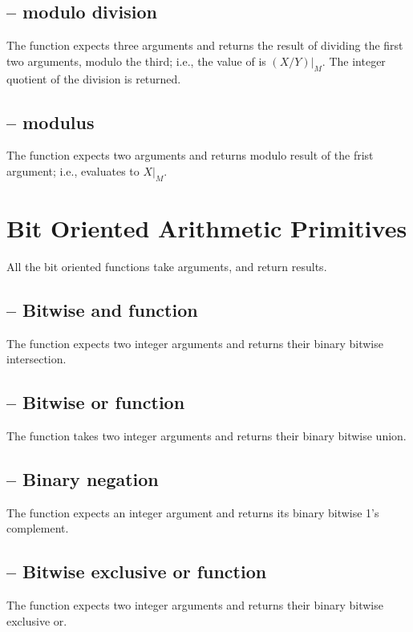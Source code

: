 \subsection{ -- modulo division}
The  function expects three  arguments and returns the result of dividing the first two arguments, modulo the third; i.e., the value of  is $(X/Y)|_M$.
The integer quotient of the division is returned.

\subsection{ -- modulus }
The  function expects two  arguments and returns modulo result of the frist argument; i.e.,  evaluates to $X|_M$.

\section{Bit Oriented Arithmetic Primitives}
All the bit oriented functions take  arguments, and return  results.

\subsection{ -- Bitwise and function}
\label{arith:band}
The  function expects two integer arguments and returns their binary bitwise intersection.

\subsection{ -- Bitwise or function}
The  function takes two integer arguments and returns their binary bitwise union.

\subsection{ -- Binary negation}
The  function expects an integer argument and returns its binary bitwise 1's complement.
              
\subsection{ -- Bitwise exclusive or function}
The  function expects two integer arguments and returns their binary bitwise exclusive or.
      
